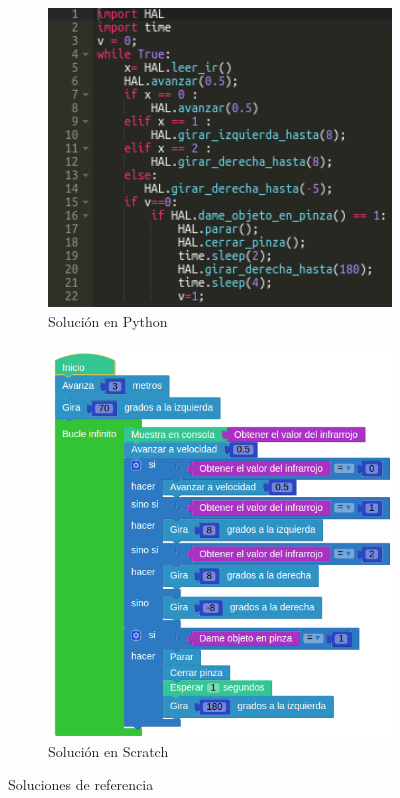 \begin{figure}[H]
  \begin{subfigure}[b]{0.5\textwidth}
  \centering
    \includegraphics[width=1\textwidth]{chapters/images/solucionppython.png}
    \caption{Solución en Python}
    \label{fig:f1}
  \end{subfigure}
  \hfill
  \begin{subfigure}[b]{0.5\textwidth}
  \centering
    \includegraphics[width=1\textwidth]{chapters/images/solucionpscratch.png}
	\caption{Solución en Scratch}    
    \label{fig:f2}
 
  \end{subfigure}
  \caption{Soluciones de referencia}
\end{figure}